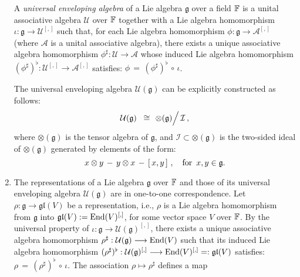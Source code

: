 \begin{enumerate}
\begin{center}
\begin{minipage}{5.25in}
	A \textit{universal enveloping algebra}
	of a Lie algebra $\mathfrak{g}$ over a field $\mathbb{F}$
	is a unital associative algebra $\mathcal{U}$ over $\mathbb{F}$ together with a Lie algebra homomorphism
	$\iota : \mathfrak{g} \longrightarrow \mathcal{U}^{[,]}$ such that,
	for each Lie algebra homomorphism $\phi : \mathfrak{g} \longrightarrow \mathcal{A}^{[,]}$
	(where $\mathcal{A}$ is a unital associative algebra),
	there exists a unique associative algebra homomorphism
	$\phi^{\sharp} : \mathcal{U} \longrightarrow \mathcal{A}$
	whose induced Lie algebra homomorphism
	$(\phi^{\sharp})^{\flat} : \mathcal{U}^{[,]} \longrightarrow \mathcal{A}^{[,]}$
	satisfies:
	$\phi \,=\, (\phi^{\sharp})^{\flat} \,\circ\, \iota$.
	\end{minipage}
	\end{center}
	The universal enveloping algebra $\mathcal{U}(\mathfrak{g})$ can be explicitly constructed as follows:
	\begin{equation*}
	\mathcal{U}(\mathfrak{g}) \;\; \cong \; \left. \overset{{\color{white}.}}{\otimes(\mathfrak{g})} \right\slash \mathcal{I}\,,
	\end{equation*}
	where $\otimes(\mathfrak{g})$ is the tensor algebra of $\mathfrak{g}$, and
	$\mathcal{I} \subset \otimes(\mathfrak{g})$ is the two-sided ideal of $\otimes(\mathfrak{g})$
	generated by elements of the form:
	\begin{equation*}
	x \otimes y \,-\, y \otimes x \,-\, \left[\,x,y\,\right]\,,
	\quad
	\textnormal{for \,$x, y \in \mathfrak{g}$}.
	\end{equation*}
\item
	The representations of a Lie algebra $\mathfrak{g}$ over $\mathbb{F}$ and
	those of its universal enveloping algebra $\mathcal{U}(\mathfrak{g})$
	are in one-to-one correspondence.
	\vskip 0.1cm
	\proof Let $\rho : \mathfrak{g} \longrightarrow \mathfrak{gl}(V)$ be a representation,
	i.e., $\rho$ is a Lie algebra homomorphism from $\mathfrak{g}$ into $\mathfrak{gl}(V) := \textnormal{End}(V)^{[,]}$,
	for some vector space $V$ over $\mathbb{F}$.
	By the universal property of
	$\iota : \mathfrak{g} \longrightarrow \mathcal{U}(\mathfrak{g})^{[,]}$,
	there exists a unique associative algebra homomorphism
	$\rho^{\sharp} : \mathcal{U}(\mathfrak{g}) \longrightarrow \textnormal{End}(V)$
	such that its induced Lie algebra homomorphism
	$(\rho^{\sharp})^{\flat} : \mathcal{U}(\mathfrak{g})^{[,]} \longrightarrow \textnormal{End}(V)^{[,]} =: \mathfrak{gl}(V)$
	satisfies:
	$\rho \,=\, (\rho^{\sharp})^{\flat} \,\circ\, \iota$.
	The association $\rho \longmapsto \rho^{\sharp}$ defines a map

\end{enumerate}
